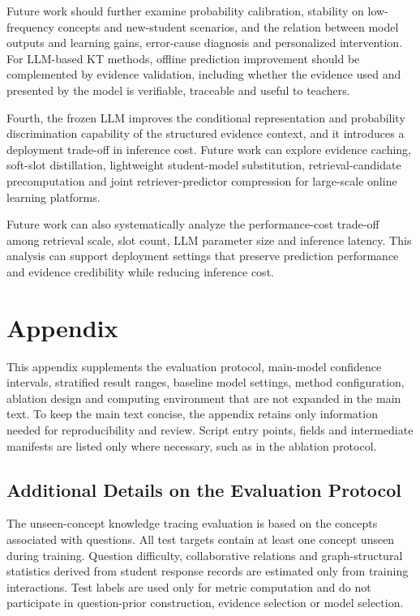 \documentclass[a4paper,12pt]{article}
\numberwithin{table}{section}
\begin{document}
Future work should further examine probability calibration, stability on low-frequency concepts and new-student scenarios, and the relation between model outputs and learning gains, error-cause diagnosis and personalized intervention. For LLM-based KT methods, offline prediction improvement should be complemented by evidence validation, including whether the evidence used and presented by the model is verifiable, traceable and useful to teachers.

Fourth, the frozen LLM improves the conditional representation and probability discrimination capability of the structured evidence context, and it introduces a deployment trade-off in inference cost. Future work can explore evidence caching, soft-slot distillation, lightweight student-model substitution, retrieval-candidate precomputation and joint retriever-predictor compression for large-scale online learning platforms.

Future work can also systematically analyze the performance-cost trade-off among retrieval scale, slot count, LLM parameter size and inference latency. This analysis can support deployment settings that preserve prediction performance and evidence credibility while reducing inference cost.

\clearpage



\clearpage
\appendix
\section{Appendix}
\label{app:experiment-details}

This appendix supplements the evaluation protocol, main-model confidence intervals, stratified result ranges, baseline model settings, method configuration, ablation design and computing environment that are not expanded in the main text. To keep the main text concise, the appendix retains only information needed for reproducibility and review. Script entry points, fields and intermediate manifests are listed only where necessary, such as in the ablation protocol.

\subsection{Additional Details on the Evaluation Protocol}

The unseen-concept knowledge tracing evaluation is based on the concepts associated with questions. All test targets contain at least one concept unseen during training. Question difficulty, collaborative relations and graph-structural statistics derived from student response records are estimated only from training interactions. Test labels are used only for metric computation and do not participate in question-prior construction, evidence selection or model selection.
\end{document}
